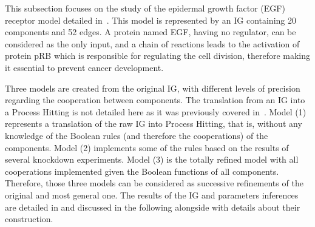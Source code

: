 This subsection focuses on the study of the epidermal growth factor (EGF) receptor model detailed in~\cite{Sahin09}.
This model is represented by an IG containing 20 components and 52 edges.
A protein named EGF, having no regulator, can be considered as the only input,
and a chain of reactions leads to the activation of protein pRB which is responsible for regulating the cell division,
therefore making it essential to prevent cancer development.

Three models are created from the original IG, with different levels of precision regarding the cooperation between components.
The translation from an IG into a Process Hitting is not detailed here as it was previously covered in~\cite{PMR10-TCSB}.
Model (1) represents a translation of the raw IG into Process Hitting, that is,
without any knowledge of the Boolean rules (and therefore the cooperations) of the components.
Model (2) implements some of the rules based on the results of several knockdown experiments.
Model (3) is the totally refined model with all cooperations implemented given the Boolean functions of all components.
Therefore, those three models can be considered as successive refinements of the original and most general one.
The results of the IG and parameters inferences are detailed in 
and discussed in the following alongside with details about their construction.

